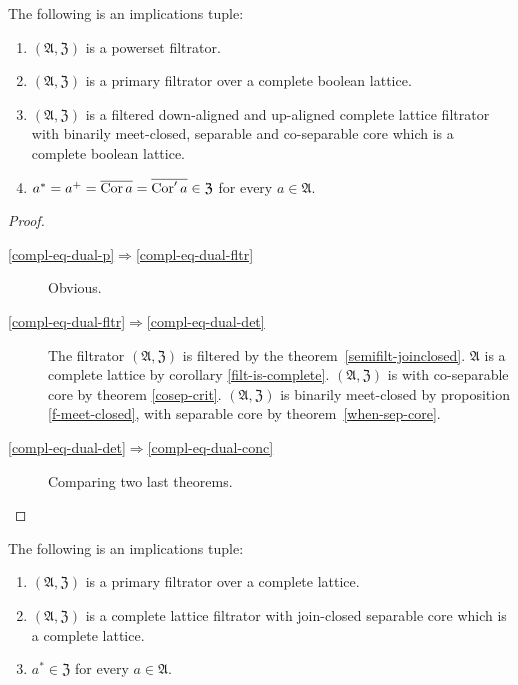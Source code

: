 \begin{thm}
\label{compl-eq-dual}The following is an implications tuple:
\begin{enumerate}
\item \label{compl-eq-dual-p}$(\mathfrak{A},\mathfrak{Z})$ is a powerset
filtrator.
\item \label{compl-eq-dual-fltr}$(\mathfrak{A},\mathfrak{Z})$ is a primary
filtrator over a complete boolean lattice.
\item \label{compl-eq-dual-det}$(\mathfrak{A},\mathfrak{Z})$ is a filtered down-aligned and up-aligned
complete lattice filtrator with binarily meet-closed, separable and
co-separable core which is a complete boolean lattice.
\item \label{compl-eq-dual-conc}$a^{\ast}=a^{+}=\overline{\operatorname{Cor} a}=\overline{\operatorname{Cor}' a}\in\mathfrak{Z}$ for
every $a\in\mathfrak{A}$.
\end{enumerate}
\end{thm}
\begin{proof}
~
\begin{description}
\item [{\ref{compl-eq-dual-p}$\Rightarrow$\ref{compl-eq-dual-fltr}}] Obvious.
\item [{\ref{compl-eq-dual-fltr}$\Rightarrow$\ref{compl-eq-dual-det}}] The
filtrator $(\mathfrak{A},\mathfrak{Z})$ is filtered by the theorem~\ref{semifilt-joinclosed}.
$\mathfrak{A}$ is a complete lattice by corollary \ref{filt-is-complete}.
$(\mathfrak{A},\mathfrak{Z})$ is with co-separable core by theorem
\ref{cosep-crit}.
$(\mathfrak{A},\mathfrak{Z})$ is
binarily meet-closed by proposition \ref{f-meet-closed}, with separable
core by theorem~\ref{when-sep-core}.

\item [{\ref{compl-eq-dual-det}$\Rightarrow$\ref{compl-eq-dual-conc}}] Comparing two last theorems.
\end{description}
\end{proof}
\begin{thm}
\label{compl-in-core}The following is an implications tuple:
\begin{enumerate}
\item \label{compl-in-core-f}$(\mathfrak{A},\mathfrak{Z})$ is a primary
filtrator over a complete lattice.
\item \label{compl-in-core-fltr}$(\mathfrak{A},\mathfrak{Z})$ is a complete
lattice filtrator with join-closed separable core which is a complete
lattice.
\item \label{compl-in-core-conc}$a^{\ast}\in\mathfrak{Z}$ for every $a\in\mathfrak{A}$.
\end{enumerate}
\end{thm}
